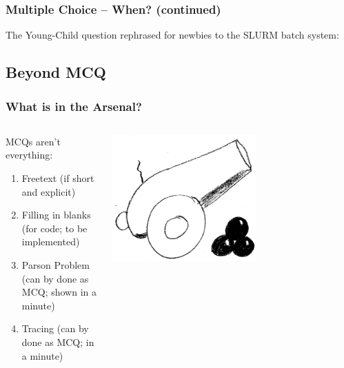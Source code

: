 \begin{frame}
 \frametitle{Multiple Choice -- When? (continued)}

 The Young-Child question rephrased for newbies to the SLURM batch system:
 \vspace{-1em}
\end{frame}

\subsection{Beyond MCQ}

\begin{frame}
  \frametitle{What is in the Arsenal?}
  \begin{columns}
   \begin{column}{.5\textwidth}
    MCQs aren't everything:
     \begin{enumerate}
      \item Freetext (if short and explicit)
      \item Filling in blanks (for code; to be implemented)
      \item Parson Problem (can by done as MCQ; shown in a minute)
      \item Tracing (can by done as MCQ; in a minute)
     \end{enumerate}
   \end{column}
   \begin{column}{.5\textwidth}
       \centering
      \includegraphics[width=0.6\textwidth]{images/arsenal}
    \end{column}
  \end{columns}
\end{frame}

